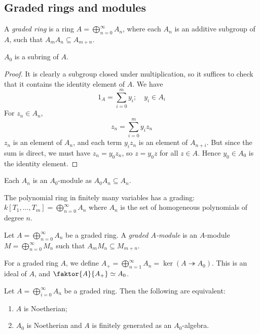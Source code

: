 \subsection{Graded rings and modules}
\begin{definition}
    A \emph{graded ring} is a ring \( A = \bigoplus_{n=0}^\infty A_n \), where each \( A_n \) is an additive subgroup of \( A \), such that \( A_m A_n \subseteq A_{m+n} \).
\end{definition}
\begin{proposition}
    \( A_0 \) is a subring of \( A \).
\end{proposition}
\begin{proof}
    It is clearly a subgroup closed under multiplication, so it suffices to check that it contains the identity element of \( A \).
    We have
    \[ 1_A = \sum_{i=0}^m y_i;\quad y_i \in A_i \]
    For \( z_n \in A_n \),
    \[ z_n = \sum_{i=0}^m y_i z_n \]
    \( z_n \) is an element of \( A_n \), and each term \( y_i z_n \) is an element of \( A_{n+i} \).
    But since the sum is direct, we must have \( z_n = y_0 z_n \), so \( z = y_0 z \) for all \( z \in A \).
    Hence \( y_0 \in A_0 \) is the identity element.
\end{proof}
\begin{remark}
    Each \( A_n \) is an \( A_0 \)-module as \( A_0 A_n \subseteq A_n \).
\end{remark}
\begin{example}
    The polynomial ring in finitely many variables has a grading: \( k[T_1, \dots, T_m] = \bigoplus_{n=0}^\infty A_n \) where \( A_n \) is the set of homogeneous polynomials of degree \( n \).
\end{example}
\begin{definition}
    Let \( A = \bigoplus_{n=0}^\infty A_n \) be a graded ring.
    A \emph{graded \( A \)-module} is an \( A \)-module \( M = \bigoplus_{n=0}^\infty M_n \) such that \( A_m M_n \subseteq M_{m+n} \).
\end{definition}
For a graded ring \( A \), we define \( A_+ = \bigoplus_{n = 1}^\infty A_n = \ker (A \twoheadrightarrow A_0) \).
This is an ideal of \( A \), and \( \faktor{A}{A_+} \simeq A_0 \).
\begin{proposition}
    Let \( A = \bigoplus_{i=0}^\infty A_n \) be a graded ring.
    Then the following are equivalent:
    \begin{enumerate}
        \item \( A \) is Noetherian;
        \item \( A_0 \) is Noetherian and \( A \) is finitely generated as an \( A_0 \)-algebra.
    \end{enumerate}
\end{proposition}

